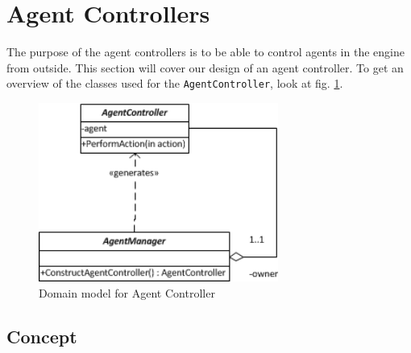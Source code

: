 
\section{Agent Controllers\label{sec:SystemFeaturesAgentControllers}}

The purpose of the agent controllers is to be able to control agents
in the engine from outside. This section will cover our design of
an agent controller. To get an overview of the classes used for the
\texttt{AgentController}, look at fig. \ref{fig:AgentControllerDomainModel}.

\begin{figure}
\begin{centering}
\includegraphics[width=0.7\textwidth]{AgentControllerDomainUML}
\par\end{centering}

\caption{Domain model for Agent Controller\label{fig:AgentControllerDomainModel}}
\end{figure}



\subsection{Concept}

